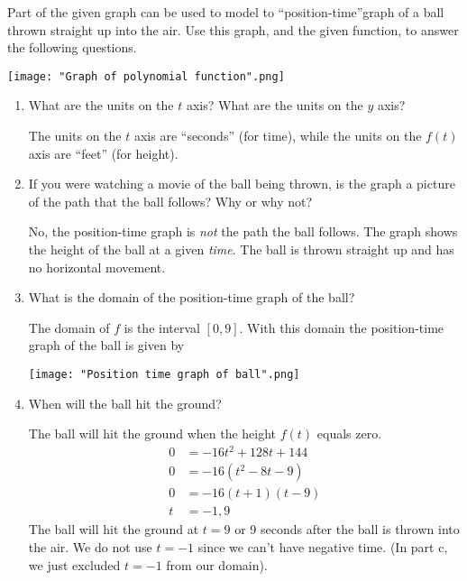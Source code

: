 \documentclass[nooutcomes]{ximera}
\begin{document}
\begin{problem}
 Part of the given graph can be used to model to ``position-time''graph of a ball thrown straight up into the air.
  Use this graph, and the given function, to answer the following questions.
  \begin{image}
    \texttt{[image: "Graph of polynomial function".png]}
  \end{image}
	
	
		\begin{enumerate}
			
		 \item  What are the units on the $t$ axis?  What are the units on the $y$ axis?
		 \begin{freeResponse}		 
	The units on the $t$ axis are ``seconds'' (for time), while the units on the $f(t)$ axis are ``feet'' (for height).        
		\end{freeResponse}
			
		\item  If you were watching a movie of the ball being thrown, is the graph a picture of the path that the ball follows?  Why or why not?
		\begin{freeResponse}		 
	 No, the position-time graph is \emph{not} the path the ball follows.
        The graph shows the height of the ball at a given \emph{time}.
        The ball is thrown straight up and has no horizontal movement.
		\end{freeResponse}
	

		\item  What is the domain of the position-time graph of the ball?

		 \begin{freeResponse}
     	   The domain of $f$ is the interval $[0, 9]$.
     	   With this domain the position-time graph of the ball is given by
       		 \begin{center}
       	  	 \texttt{[image: "Position time graph of ball".png]}
        		\end{center}
     	 \end{freeResponse}

		\item  When will the ball hit the ground?
		\begin{freeResponse}		 
		The ball will hit the ground when the height $f(t)$ equals zero.
			\begin{align*}
			0&=-16t^2+128t+144 \\
			0&=-16(t^2-8t-9) \\
 			0&=-16(t+1)(t-9) \\
 			t&=-1,9 
 			\end{align*}
		The ball will hit the ground at $t=9$ or 9 seconds after the ball is thrown into the air.  We do not use $t=-1$ since we can't have negative time. (In part c, we just excluded $t=-1$ from our domain).
		\end{freeResponse}
		

\end{enumerate}
\end{problem}
\end{document}
